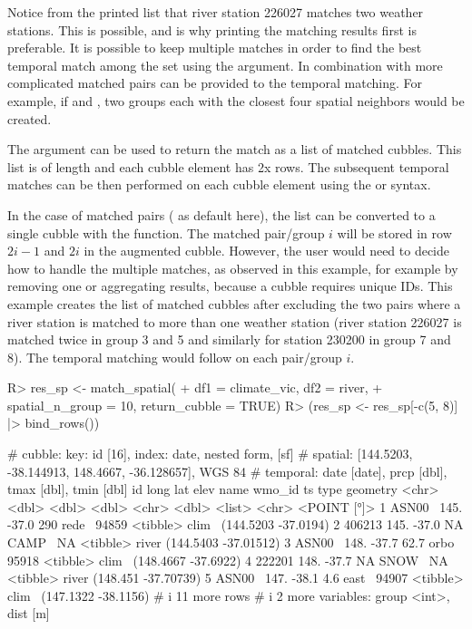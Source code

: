\documentclass[
  shortnames]{jss}
\begin{document}
Notice from the printed list that river station 226027 matches two weather stations. This is possible, and is why printing the matching results first is preferable. It is possible to keep multiple matches in order to find the best temporal match among the set using the  argument. In combination with  more complicated matched pairs can be provided to the temporal matching. For example, if  and , two groups each with the closest four spatial neighbors would be created.

The argument  can be used to return the match as a list of matched cubbles. This list is of length  and each cubble element has 2x rows. The subsequent temporal matches can be then performed on each cubble element using the  or  syntax.

In the case of matched pairs ( as default here), the list can be converted to a single cubble with the  function. The matched pair/group \(i\) will be stored in row \(2i-1\) and \(2i\) in the augmented cubble. However, the user would need to decide how to handle the multiple matches, as observed in this example, for example by removing one or aggregating results, because a cubble requires unique IDs. This example creates the list of matched cubbles after excluding the two pairs where a river station is matched to more than one weather station (river station 226027 is matched twice in group 3 and 5 and similarly for station 230200 in group 7 and 8). The temporal matching would follow on each pair/group \(i\).

\begin{CodeChunk}
\begin{CodeInput}
R> res_sp <- match_spatial(
+   df1 = climate_vic, df2 = river, 
+   spatial_n_group = 10, return_cubble = TRUE)
R> (res_sp <- res_sp[-c(5, 8)] |> bind_rows())
\end{CodeInput}
\begin{CodeOutput}
# cubble:   key: id [16], index: date, nested form, [sf]
# spatial:  [144.5203, -38.144913, 148.4667, -36.128657], WGS 84
# temporal: date [date], prcp [dbl], tmax [dbl], tmin [dbl]
  id      long   lat  elev name  wmo_id ts       type              geometry
  <chr>  <dbl> <dbl> <dbl> <chr>  <dbl> <list>   <chr>          <POINT [°]>
1 ASN00~  145. -37.0 290   rede~  94859 <tibble> clim~  (144.5203 -37.0194)
2 406213  145. -37.0  NA   CAMP~     NA <tibble> river (144.5403 -37.01512)
3 ASN00~  148. -37.7  62.7 orbo~  95918 <tibble> clim~  (148.4667 -37.6922)
4 222201  148. -37.7  NA   SNOW~     NA <tibble> river  (148.451 -37.70739)
5 ASN00~  147. -38.1   4.6 east~  94907 <tibble> clim~  (147.1322 -38.1156)
# i 11 more rows
# i 2 more variables: group <int>, dist [m]
\end{CodeOutput}
\end{CodeChunk}
\end{document}
